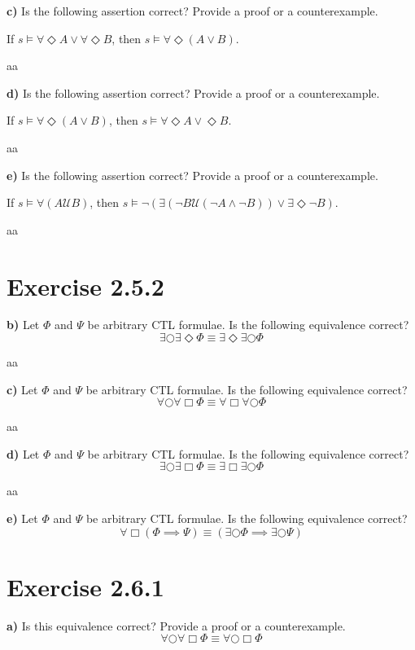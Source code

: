 \documentclass[titlepage, letterpaper, fleqn]{article}
\newcommand{\until}{\mathscr{U}}
\begin{document}
{\large \textbf{c)} Is the following assertion correct? Provide a proof or a counterexample.

If \(s \models \forall \Diamond A \vee \forall \Diamond B\), then \(s \models \forall \Diamond (A \vee B)\).}

aa

{\large \textbf{d)} Is the following assertion correct? Provide a proof or a counterexample.

If \(s \models \forall \Diamond(A \vee B)\), then \(s \models \forall \Diamond A \vee \Diamond B\).}

aa

{\large \textbf{e)} Is the following assertion correct? Provide a proof or a counterexample.

If \(s \models \forall (A \until B)\), then \(s \models \neg (\exists (\neg B \until(\neg A \wedge \neg B)) \vee \exists \Diamond \neg B)\).}

aa

\section{Exercise 2.5.2}

{\large \textbf{b)} Let \(\Phi\) and \(\Psi\) be arbitrary CTL formulae. Is the following equivalence correct?
\[\exists \bigcirc \exists \Diamond \Phi \equiv \exists \Diamond \exists \bigcirc \Phi\]}

aa

{\large \textbf{c)} Let \(\Phi\) and \(\Psi\) be arbitrary CTL formulae. Is the following equivalence correct?
\[\forall \bigcirc \forall \Box \Phi \equiv \forall \Box \forall \bigcirc \Phi\]}

aa

{\large \textbf{d)} Let \(\Phi\) and \(\Psi\) be arbitrary CTL formulae. Is the following equivalence correct?
\[\exists \bigcirc \exists \Box \Phi \equiv \exists \Box \exists \bigcirc \Phi\]}

aa

{\large \textbf{e)} Let \(\Phi\) and \(\Psi\) be arbitrary CTL formulae. Is the following equivalence correct?
\[\forall \Box(\Phi \implies \Psi) \equiv (\exists \bigcirc \Phi \implies \exists \bigcirc \Psi)\]}

\section{Exercise 2.6.1}

{\large \textbf{a)} Is this equivalence correct? Provide a proof or a counterexample.
\[\forall \bigcirc \forall \Box \Phi \equiv \forall \bigcirc \Box \Phi\]}
\end{document}
